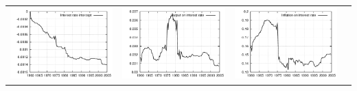 \documentclass{beamer}
\begin{document}
{\begin{tabular}{|cccc|}
  \includegraphics[scale=0.17]{plots2/initre_Interest_rate_intercept.png} &
  \includegraphics[scale=0.17]{plots2/initre_Output_on_interest_rate.png} &
  \includegraphics[scale=0.17]{plots2/initre_Inflation_on_interest_rate.png} & 

\end{tabular}}
\end{document}

